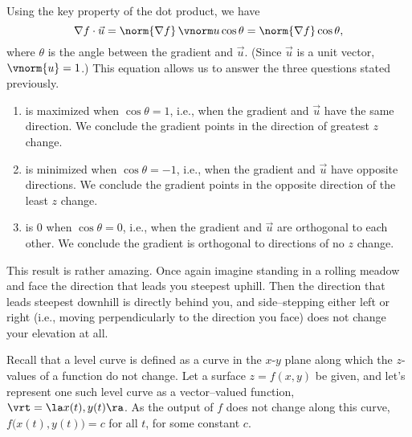 Using the key property of the dot product, we have
\begin{equation}\nabla f\cdot \vec u = \norm{\nabla f}\,\vnorm u \cos \theta = \norm{\nabla f}\cos \theta, \label{eq:gradient}\end{equation}
where $\theta$ is the angle between the gradient and $\vec u$. (Since $\vec u$ is a unit vector, $\vnorm{u} = 1$.) This equation allows us to answer the three questions stated previously.

\begin{enumerate}
	\item {} is maximized when $\cos \theta =1$, i.e., when the gradient and $\vec u$ have the same direction. We conclude the gradient points in the direction of greatest $z$ change.
	\item	{} is minimized when $\cos \theta = -1$, i.e., when the gradient and $\vec u$ have opposite directions. We conclude the gradient points in the opposite direction of the least $z$ change.
	\item {} is 0 when $\cos \theta = 0$, i.e., when the gradient and $\vec u$ are orthogonal to each other. We conclude the gradient is orthogonal to directions of no $z$ change. 
\end{enumerate}

This result is rather amazing. Once again imagine standing in a rolling meadow and face the  direction that leads you steepest uphill. Then the direction that leads steepest downhill is directly behind you, and side--stepping either left or right (i.e., moving perpendicularly to the direction you face) does not change your elevation at all.


Recall that a level curve is defined as a curve in the $x$-$y$ plane along which the $z$-values of a function do not change. Let a surface $z=f(x,y)$ be given, and let's represent one such level curve as a vector--valued function, $\vrt = \la x(t), y(t)\ra$. As the output of $f$ does not change along this curve, $f\big(x(t),y(t)\big) = c$ for all $t$, for some constant $c$.

